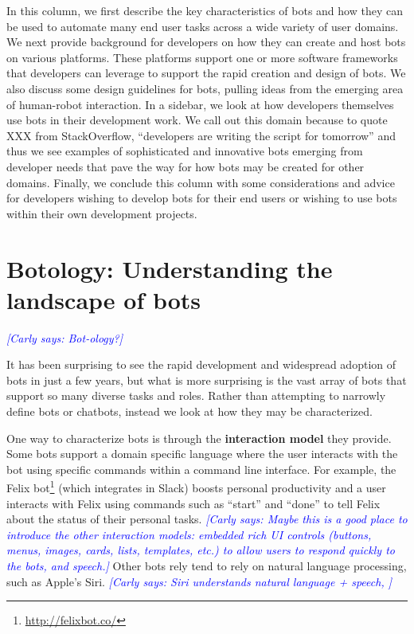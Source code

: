 \documentclass{sig-alternate}
\newcommand{\cl}[1]{\textcolor{blue}{{\it [Carly says: #1]}}}
\begin{document}
In this column, we first describe the key characteristics of bots and how they can be used to automate many end user tasks across a wide variety of user domains.  
We next provide background for developers on how they can create and host bots on various platforms. These platforms support one or more software frameworks that developers can leverage to support the rapid creation and design of bots. We also discuss some design guidelines for bots, pulling ideas from the emerging area of human-robot interaction. 
In a sidebar, we look at how developers themselves use bots in their development work.  We call out this domain because to quote XXX from StackOverflow, ``developers are writing the script for tomorrow'' and thus we see examples of sophisticated and innovative bots emerging from developer needs that pave the way for how bots may be created for other domains.
Finally, we conclude this column with some considerations and advice for developers wishing to develop bots for their end users or wishing to use bots within their own development projects.   

  

\section{Botology: Understanding the landscape of bots}
\cl{Bot-ology?}



It has been surprising to see the rapid development and widespread adoption of bots in just a few years, but what is more surprising is the vast array of bots that support so many diverse tasks and roles.  
Rather than attempting to narrowly define bots or chatbots, instead we look at how they may be characterized. 

One way to characterize bots is through the \textbf{interaction model} they provide. 
Some bots support a domain specific language where the user interacts with the bot using specific commands within a command line interface.  For example, the Felix bot\footnote{\url{http://felixbot.co/}} (which integrates in Slack) boosts personal productivity and a user interacts with Felix using commands such as ``start'' and ``done'' to tell Felix about the status of their personal tasks. \cl{Maybe this is a good place to introduce the other interaction models: embedded rich UI controls (buttons, menus, images, cards, lists, templates, etc.) to allow users to respond quickly to the bots, and speech.}
Other bots rely tend to rely on natural language processing, such as Apple's Siri. \cl{Siri understands natural language + speech, }
\end{document}

